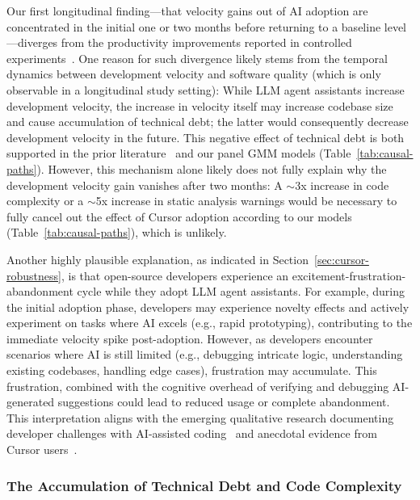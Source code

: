 Our first longitudinal finding---that velocity gains out of AI adoption are concentrated in the initial one or two months before returning to a baseline level---diverges from the productivity improvements reported in controlled experiments~\cite[e.g.,][]{DBLP:journals/corr/abs-2302-06590, DBLP:conf/icse-seip/ParadisGMNMMZFC25}. 
One reason for such divergence likely stems from the temporal dynamics between development velocity and software quality (which is only observable in a longitudinal study setting): While LLM agent assistants increase development velocity, the increase in velocity itself may increase codebase size and cause accumulation of technical debt; the latter would consequently decrease development velocity in the future.
This negative effect of technical debt is both supported in the prior literature~\cite{DBLP:conf/sigsoft/ChengMCJGKZ022, besker2018technical} and our panel GMM models (Table~\ref{tab:causal-paths}).
However, this mechanism alone likely does not fully explain why the development velocity gain vanishes after two months: A $\sim$3x increase in code complexity or a $\sim$5x increase in static analysis warnings would be necessary to fully cancel out the effect of Cursor adoption according to our models (Table~\ref{tab:causal-paths}), which is unlikely.

Another highly plausible explanation, as indicated in Section~\ref{sec:cursor-robustness}, is that open-source developers experience an excitement-frustration-abandonment cycle while they adopt LLM agent assistants.
For example, during the initial adoption phase, developers may experience novelty effects and actively experiment on tasks where AI excels (e.g., rapid prototyping), contributing to the immediate velocity spike post-adoption. 
However, as developers encounter scenarios where AI is still limited (e.g., debugging intricate logic, understanding existing codebases, handling edge cases), frustration may accumulate. 
This frustration, combined with the cognitive overhead of verifying and debugging 
AI-generated suggestions could lead to reduced usage or complete abandonment.
This interpretation aligns with the emerging qualitative research documenting 
developer challenges with AI-assisted coding~\cite{DBLP:conf/icse/Liang0M24, DBLP:journals/corr/abs-2507-09089, DBLP:journals/corr/abs-2507-08149} and anecdotal evidence from Cursor users~\cite[e.g.,][]{cursor-critique1, cursor-critique2}.

\subsubsection{The Accumulation of Technical Debt and Code Complexity}

